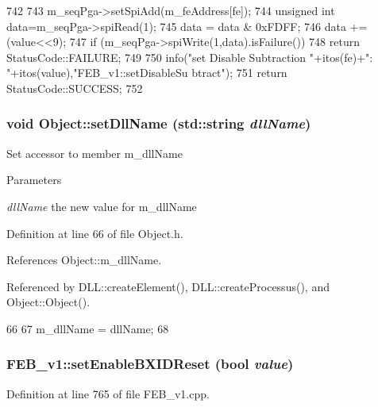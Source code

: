 \begin{DoxyCode}
742                                                          {
743   m_seqPga->setSpiAdd(m_feAddress[fe]);
744   unsigned int data=m_seqPga->spiRead(1);
745   data = data & 0xFDFF;
746   data += (value<<9);
747   if (m_seqPga->spiWrite(1,data).isFailure()){
748     return StatusCode::FAILURE;
749   }
750   info("set Disable Subtraction "+itos(fe)+": "+itos(value),"FEB_v1::setDisableSu
      btract");
751   return StatusCode::SUCCESS;
752 }
\end{DoxyCode}
\hypertarget{classObject_a870c5af919958c2136623b2d7816d123}{
\subsubsection[{setDllName}]{\setlength{\rightskip}{0pt plus 5cm}void Object::setDllName (std::string {\em dllName})}}
\label{classObject_a870c5af919958c2136623b2d7816d123}
Set accessor to member m\_\-dllName 
\begin{DoxyParams}{Parameters}
\item[{\em dllName}]the new value for m\_\-dllName \end{DoxyParams}


Definition at line 66 of file Object.h.

References Object::m\_\-dllName.

Referenced by DLL::createElement(), DLL::createProcessus(), and Object::Object().


\begin{DoxyCode}
66                                       {
67     m_dllName = dllName;
68   }
\end{DoxyCode}
\hypertarget{classFEB__v1_a2ad20ff9db6a0ceef875d874bae214a9}{
\subsubsection[{setEnableBXIDReset}]{ FEB\_\-v1::setEnableBXIDReset (bool {\em value})}}
\label{classFEB__v1_a2ad20ff9db6a0ceef875d874bae214a9}


Definition at line 765 of file FEB\_\-v1.cpp.

